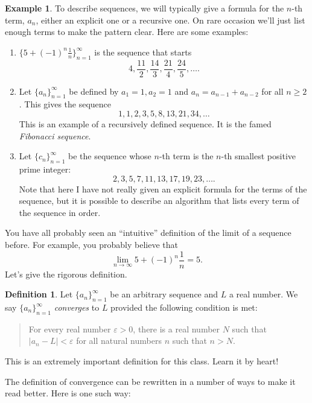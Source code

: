 \documentclass[12pt]{amsart}
\def\e{\varepsilon}
\numberwithin{equation}{section}
\theoremstyle{plain} %
\theoremstyle{definition}
\newtheorem{defn}[equation]{Definition}
\newtheorem{ex}[equation]{Example}
\theoremstyle{remark}
\begin{document}
\begin{ex} To describe sequences, we will typically give a formula for the $n$-th term, $a_n$, either an explicit one or a recursive one. On rare occasion we'll
  just list enough terms to make the pattern clear. Here are some examples:
\begin{enumerate}

\item $\{5 + (-1)^n \frac{1}{n}\}_{n=1}^\infty$ is the sequence that starts
$$
4, \frac{11}2,  \frac{14}{3}, \frac{21}4, \frac{24}5, \dots.
$$

\item Let $\{a_n\}_{n=1}^\infty$ be defined by $a_1 = 1, a_2 = 1$ and $a_n = a_{n-1} + a_{n-2}$ for all $n \geq 2$. This gives the sequence
$$
1, 1, 2, 3, 5, 8, 13, 21, 34, \dots
$$
This is an example of a recursively defined sequence. It is the famed {\em Fibonacci sequence}. 

\item Let $\{c_n\}_{n=1}^\infty$ be the sequence whose $n$-th term is the $n$-th smallest positive prime integer:
$$
2, 3, 5, 7, 11, 13, 17, 19, 23, \dots.
$$
Note that here I have not really given an explicit formula for the terms of the sequence, but it is possible to describe an algorithm that lists every term of the sequence in
order.
\end{enumerate}

\end{ex}


You have all probably seen an ``intuitive'' definition of the limit of a sequence before. For example, you probably believe that
$$
\lim_{n \to \infty} 5 + (-1)^n \frac{1}{n} = 5.
$$
Let's give the rigorous definition.

\begin{defn} Let $\{a_n\}_{n=1}^\infty$ be an arbitrary sequence and $L$ a real number. We say $\{a_n\}_{n=1}^\infty$ {\em converges} to $L$ provided the
  following condition is met:
\begin{quote}
For every real number $\e > 0$, there is a real number $N$ such that $|a_n - L| < \e$ for all natural numbers $n$ such that $n > N$.
\end{quote}
\end{defn}

This is an extremely important definition for this class. Learn it by heart!


The definition of convergence can be rewritten in a number of ways to make it read better. Here is one such way:
\end{document}
